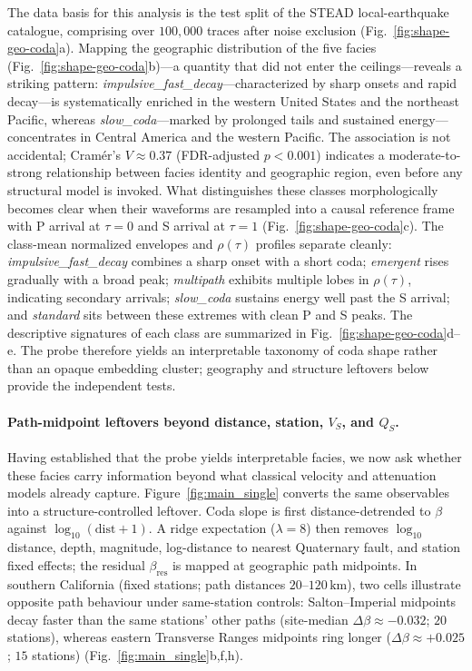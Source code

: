 \documentclass[twocolumn, 10pt]{article}
\begin{document}
The data basis for this analysis is the test split of the STEAD local-earthquake catalogue, comprising over \(100{,}000\) traces after noise exclusion (Fig.~\ref{fig:shape-geo-coda}a). Mapping the geographic distribution of the five facies (Fig.~\ref{fig:shape-geo-coda}b)---a quantity that did not enter the ceilings---reveals a striking pattern: \textit{impulsive\_fast\_decay}---characterized by sharp onsets and rapid decay---is systematically enriched in the western United States and the northeast Pacific, whereas \textit{slow\_coda}---marked by prolonged tails and sustained energy---concentrates in Central America and the western Pacific. The association is not accidental; Cram\'er's \(V\approx0.37\) (FDR-adjusted \(p<0.001\)) indicates a moderate-to-strong relationship between facies identity and geographic region, even before any structural model is invoked. What distinguishes these classes morphologically becomes clear when their waveforms are resampled into a causal reference frame with P arrival at \(\tau=0\) and S arrival at \(\tau=1\) (Fig.~\ref{fig:shape-geo-coda}c). The class-mean normalized envelopes and \(\rho(\tau)\) profiles separate cleanly: \textit{impulsive\_fast\_decay} combines a sharp onset with a short coda; \textit{emergent} rises gradually with a broad peak; \textit{multipath} exhibits multiple lobes in \(\rho(\tau)\), indicating secondary arrivals; \textit{slow\_coda} sustains energy well past the S arrival; and \textit{standard} sits between these extremes with clean P and S peaks. The descriptive signatures of each class are summarized in Fig.~\ref{fig:shape-geo-coda}d--e. The probe therefore yields an interpretable taxonomy of coda shape rather than an opaque embedding cluster; geography and structure leftovers below provide the independent tests\cite{aki1969,aki1975,herraiz2023}.

\paragraph{Path-midpoint leftovers beyond distance, station, \(V_S\), and \(Q_S\).}
Having established that the probe yields interpretable facies, we now ask whether these facies carry information beyond what classical velocity and attenuation models already capture. Figure~\ref{fig:main_single} converts the same observables into a structure-controlled leftover. Coda slope is first distance-detrended to \(\beta\) against \(\log_{10}(\mathrm{dist}+1)\). A ridge expectation (\(\lambda=8\)) then removes \(\log_{10}\) distance, depth, magnitude, log-distance to nearest Quaternary fault, and station fixed effects; the residual \(\beta_{\mathrm{res}}\) is mapped at geographic path midpoints. In southern California (fixed stations; path distances \(20\)--\(120\,\mathrm{km}\)), two cells illustrate opposite path behaviour under same-station controls: Salton--Imperial midpoints decay faster than the same stations' other paths (site-median \(\Delta\beta\approx-0.032\); \(20\) stations), whereas eastern Transverse Ranges midpoints ring longer (\(\Delta\beta\approx+0.025\); \(15\) stations) (Fig.~\ref{fig:main_single}b,f,h).
\end{document}

